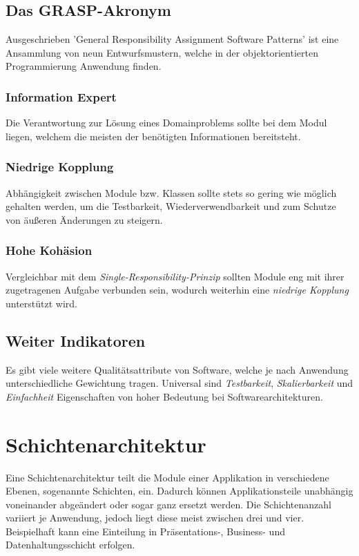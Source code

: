 \documentclass[conference]{IEEEtran}
\begin{document}
\subsection{Das GRASP-Akronym} Ausgeschrieben 'General Responsibility Assignment Software Patterns' ist eine Ansammlung von neun Entwurfsmustern, welche in der objektorientierten Programmierung Anwendung finden.

\subsubsection{Information Expert} Die Verantwortung zur Lösung eines Domainproblems sollte bei dem Modul liegen, welchem die meisten der benötigten Informationen bereitsteht.

\subsubsection{Niedrige Kopplung} Abhängigkeit zwischen Module bzw. Klassen sollte stets so gering wie möglich gehalten werden, um die Testbarkeit, Wiederverwendbarkeit und zum Schutze von äußeren Änderungen zu steigern.

\subsubsection{Hohe Kohäsion} Vergleichbar mit dem \emph{Single-Responsibility-Prinzip} sollten Module eng mit ihrer zugetragenen Aufgabe verbunden sein, wodurch weiterhin eine \emph{niedrige Kopplung} unterstützt wird.



\subsection{Weiter Indikatoren} Es gibt viele weitere Qualitätsattribute von Software, welche je nach Anwendung unterschiedliche Gewichtung tragen. Universal sind \emph{Testbarkeit}, \emph{Skalierbarkeit} und \emph{Einfachheit}  Eigenschaften von hoher Bedeutung bei Softwarearchitekturen.



\section{Schichtenarchitektur}

Eine Schichtenarchitektur teilt die Module einer Applikation in verschiedene Ebenen, sogenannte Schichten, ein. Dadurch können Applikationsteile unabhängig voneinander abgeändert oder sogar ganz ersetzt werden. Die Schichtenanzahl variiert je Anwendung, jedoch liegt diese meist zwischen drei und vier. Beispielhaft kann eine Einteilung in Präsentations-, Business- und Datenhaltungsschicht erfolgen.
\end{document}
